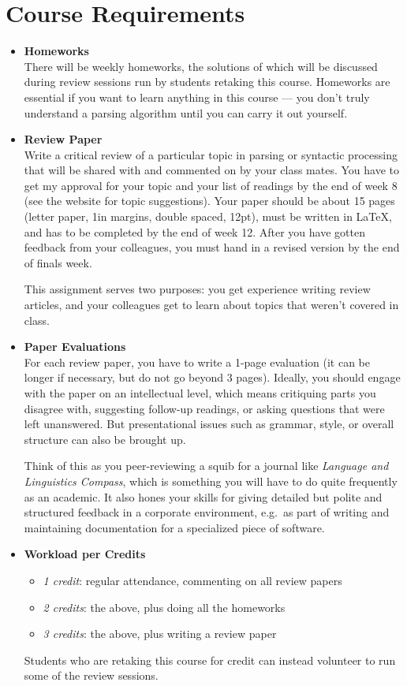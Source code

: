\section{Course Requirements}
\begin{itemize}
    \item \textbf{Homeworks}\\
        There will be weekly homeworks, the solutions of which will be discussed during review sessions run by students retaking this course.
        Homeworks are essential if you want to learn anything in this course --- you don't truly understand a parsing algorithm until you can carry it out yourself.
    \item \textbf{Review Paper}\\
        Write a critical review of a particular topic in parsing or syntactic processing that will be shared with and commented on by your class mates.
        You have to get my approval for your topic and your list of readings by the end of week 8 (see the website for topic suggestions).
        Your paper should be about 15 pages (letter paper, 1in margins, double spaced, 12pt), must be written in \LaTeX, and has to be completed by the end of week 12.
        After you have gotten feedback from your colleagues, you must hand in a revised version by the end of finals week.

        This assignment serves two purposes: you get experience writing review articles, and your colleagues get to learn about topics that weren't covered in class.
    \item \textbf{Paper Evaluations}\\
        For each review paper, you have to write a 1-page evaluation (it can be longer if necessary, but do not go beyond 3 pages).
        Ideally, you should engage with the paper on an intellectual level, which means critiquing parts you disagree with, suggesting follow-up readings, or asking questions that were left unanswered.
        But presentational issues such as grammar, style, or overall structure can also be brought up.

        Think of this as you peer-reviewing a squib for a journal like \emph{Language and Linguistics Compass}, which is something you will have to do quite frequently as an academic.
        It also hones your skills for giving detailed but polite and structured feedback in a corporate environment, e.g.\ as part of writing and maintaining documentation for a specialized piece of software.
    \item \textbf{Workload per Credits}
        \begin{itemize}
            \item \emph{1 credit}: regular attendance, commenting on all review papers
            \item \emph{2 credits}: the above, plus doing all the homeworks
            \item \emph{3 credits}: the above, plus writing a review paper
        \end{itemize}
        Students who are retaking this course for credit can instead volunteer to run some of the review sessions.
\end{itemize}

